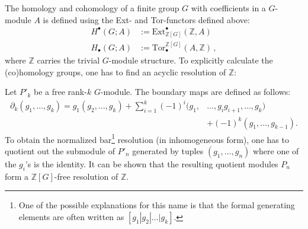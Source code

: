 	The homology and cohomology of a finite group $G$ with coefficients in a $G$-module $A$ is defined using the Ext- and Tor-functors defined above:
	\begin{align}
		H^\bullet(G;A) &:= \mathrm{Ext}_{\mathbb{Z}[G]}^\bullet(\mathbb{Z},A)\\
		H_\bullet(G;A) &:= \mathrm{Tor}^{\mathbb{Z}[G]}_\bullet(A,\mathbb{Z})\,,
	\end{align}
	where $\mathbb{Z}$ carries the trivial $G$-module structure. To explicitly calculate the (co)homology groups, one has to find an acyclic resolution of $\mathbb{Z}$:
	\begin{construct}
		Let $P'_k$ be a free rank-$k$ $G$-module. The boundary maps are defined as follows:
		\begin{align}
			\label{homalg:group_boundary}
			\partial_k(g_1,\ldots,g_k) = g_1(g_2,\ldots,g_k) + \sum_{i=1}^k (-1)^i(g_1,&\ldots,g_ig_{i+1},\ldots,g_k)\\
             &+ (-1)^k(g_1,\ldots,g_{k-1}).\nonumber
		\end{align}
		To obtain the normalized bar\footnote{One of the possible explanations for this name is that the formal generating elements are often written as $[g_1|g_2|\ldots|g_k]$.} resolution (in inhomogeneous form), one has to quotient out the submodule of $P'_n$ generated by tuples $(g_1,\ldots,g_n)$ where one of the $g_i$'s is the identity. It can be shown that the resulting quotient modules $P_n$ form a $\mathbb{Z}[G]$-free resolution of $\mathbb{Z}$.
	\end{construct}

